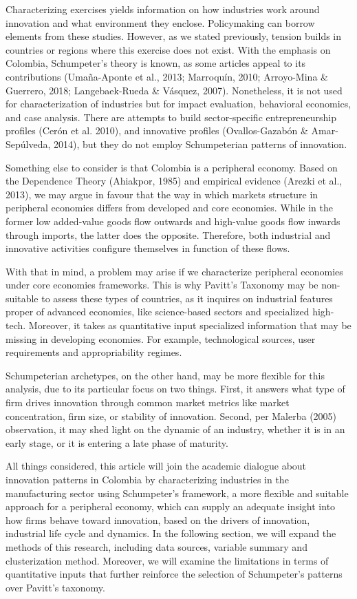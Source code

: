 \documentclass[12pt,a4paper]{article}
\begin{document}
Characterizing exercises yields information on how industries work around innovation and what environment they enclose. Policymaking can borrow elements from these studies. However, as we stated previously, tension builds in countries or regions where this exercise does not exist. With the emphasis on Colombia, Schumpeter's theory is known, as some articles appeal to its contributions (Umaña-Aponte et al., 2013; Marroquín, 2010; Arroyo-Mina \& Guerrero, 2018; Langebaek-Rueda \& Vásquez, 2007). Nonetheless, it is not used for characterization of industries but for impact evaluation, behavioral economics, and case analysis. There are attempts to build sector-specific entrepreneurship profiles (Cerón et al. 2010), and innovative profiles (Ovallos-Gazabón \& Amar-Sepúlveda, 2014), but they do not employ Schumpeterian patterns of innovation.  

Something else to consider is that Colombia is a peripheral economy. Based on the Dependence Theory (Ahiakpor, 1985) and empirical evidence (Arezki et al., 2013), we may argue in favour that the way in which markets structure in peripheral economies differs from developed and core economies. While in the former low added-value goods flow outwards and high-value goods flow inwards through imports, the latter does the opposite. Therefore, both industrial and innovative activities configure themselves in function of these flows. 

With that in mind, a problem may arise if we characterize peripheral economies under core economies frameworks. This is why Pavitt’s Taxonomy may be non-suitable to assess these types of countries, as it inquires on industrial features proper of advanced economies, like science-based sectors and specialized high-tech. Moreover, it takes as quantitative input specialized information that may be missing in developing economies. For example, technological sources, user requirements and appropriability regimes. 

Schumpeterian archetypes, on the other hand, may be more flexible for this analysis, due to its particular focus on two things. First, it answers what type of firm drives innovation through common market metrics like market concentration, firm size, or stability of innovation. Second, per Malerba (2005) observation, it may shed light on the dynamic of an industry, whether it is in an early stage, or it is entering a late phase of maturity.  

All things considered, this article will join the academic dialogue about innovation patterns in Colombia by characterizing industries in the manufacturing sector using Schumpeter's framework, a more flexible and suitable approach for a peripheral economy, which can supply an adequate insight into how firms behave toward innovation, based on the drivers of innovation, industrial life cycle and dynamics. In the following section, we will expand the methods of this research, including data sources, variable summary and clusterization method. Moreover, we will examine the limitations in terms of quantitative inputs that further reinforce the selection of Schumpeter’s patterns over Pavitt’s taxonomy. 
\end{document}
